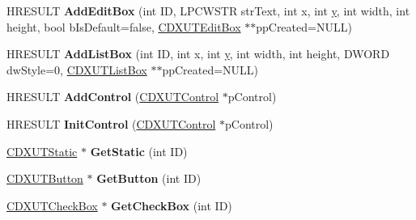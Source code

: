 \begin{DoxyCompactItemize}
\item 
\hypertarget{class_c_d_x_u_t_dialog_a1374799d1714dc22e7c54a0e76688dcf}{H\+R\+E\+S\+U\+L\+T {\bfseries Add\+Edit\+Box} (int I\+D, L\+P\+C\+W\+S\+T\+R str\+Text, int x, int \hyperlink{_ice_utils_8h_aa7ffaed69623192258fb8679569ff9ba}{y}, int width, int height, bool b\+Is\+Default=false, \hyperlink{class_c_d_x_u_t_edit_box}{C\+D\+X\+U\+T\+Edit\+Box} $\ast$$\ast$pp\+Created=N\+U\+L\+L)}\label{class_c_d_x_u_t_dialog_a1374799d1714dc22e7c54a0e76688dcf}

\item 
\hypertarget{class_c_d_x_u_t_dialog_a10004abccfeb7cad590614ff5b2cde65}{H\+R\+E\+S\+U\+L\+T {\bfseries Add\+List\+Box} (int I\+D, int x, int \hyperlink{_ice_utils_8h_aa7ffaed69623192258fb8679569ff9ba}{y}, int width, int height, D\+W\+O\+R\+D dw\+Style=0, \hyperlink{class_c_d_x_u_t_list_box}{C\+D\+X\+U\+T\+List\+Box} $\ast$$\ast$pp\+Created=N\+U\+L\+L)}\label{class_c_d_x_u_t_dialog_a10004abccfeb7cad590614ff5b2cde65}

\item 
\hypertarget{class_c_d_x_u_t_dialog_a5a3ebb7853b588e398eb992b56274c35}{H\+R\+E\+S\+U\+L\+T {\bfseries Add\+Control} (\hyperlink{class_c_d_x_u_t_control}{C\+D\+X\+U\+T\+Control} $\ast$p\+Control)}\label{class_c_d_x_u_t_dialog_a5a3ebb7853b588e398eb992b56274c35}

\item 
\hypertarget{class_c_d_x_u_t_dialog_aacf7b4a85cd752ab8aa9d676138adf86}{H\+R\+E\+S\+U\+L\+T {\bfseries Init\+Control} (\hyperlink{class_c_d_x_u_t_control}{C\+D\+X\+U\+T\+Control} $\ast$p\+Control)}\label{class_c_d_x_u_t_dialog_aacf7b4a85cd752ab8aa9d676138adf86}

\item 
\hypertarget{class_c_d_x_u_t_dialog_a0dd93066e5f93a858ba748d4d61c0f60}{\hyperlink{class_c_d_x_u_t_static}{C\+D\+X\+U\+T\+Static} $\ast$ {\bfseries Get\+Static} (int I\+D)}\label{class_c_d_x_u_t_dialog_a0dd93066e5f93a858ba748d4d61c0f60}

\item 
\hypertarget{class_c_d_x_u_t_dialog_a3dc0b6d056c7bc9c035c808d4b2b8803}{\hyperlink{class_c_d_x_u_t_button}{C\+D\+X\+U\+T\+Button} $\ast$ {\bfseries Get\+Button} (int I\+D)}\label{class_c_d_x_u_t_dialog_a3dc0b6d056c7bc9c035c808d4b2b8803}

\item 
\hypertarget{class_c_d_x_u_t_dialog_a69bff29d7b3dda3665fe23acff9b075d}{\hyperlink{class_c_d_x_u_t_check_box}{C\+D\+X\+U\+T\+Check\+Box} $\ast$ {\bfseries Get\+Check\+Box} (int I\+D)}\label{class_c_d_x_u_t_dialog_a69bff29d7b3dda3665fe23acff9b075d}


\end{DoxyCompactItemize}
